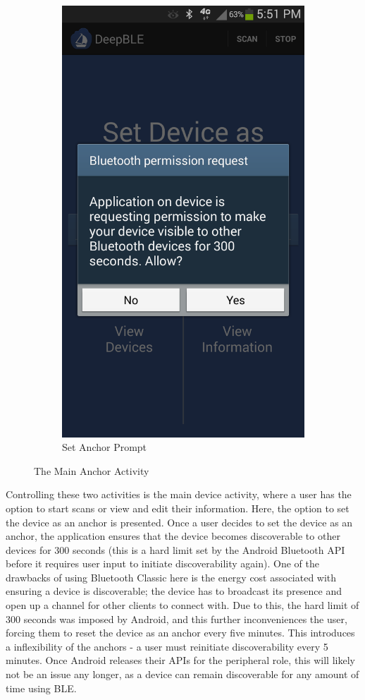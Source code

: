 \documentclass{sig-alternate}
\begin{document}
\begin{figure}[h!]
\begin{subfigure}{.5\linewidth}
		\includegraphics[width=.8\linewidth]{set_discoverable}
		\caption{Set Anchor Prompt}
	\end{subfigure}

	\caption{The Main Anchor Activity}
	\label{fig:Main Activity}
\end{figure}

Controlling these two activities is the main device activity, where a
user has the option to start scans or view and edit their information.
Here, the option to set the device as an anchor is presented. Once
a user decides to set the device as an anchor, the application
ensures that the device becomes discoverable to other devices
for 300 seconds (this is a hard limit set by the Android Bluetooth
API before it requires user input to initiate discoverability again). 
One of the drawbacks of using Bluetooth Classic here is
the energy cost associated with ensuring a device is discoverable;
the device has to broadcast its presence and open up a channel for
other clients to connect with. Due to this, the hard limit of 300 seconds
was imposed by Android, and this further inconveniences the user, forcing
them to reset the device as an anchor every five minutes. This 
introduces a inflexibility of the anchors - a user must reinitiate 
discoverability every 5 minutes. Once Android releases their
APIs for the peripheral role, this will likely not be an issue any longer, 
as a device can remain discoverable for any amount of time using
BLE.
\end{document}
